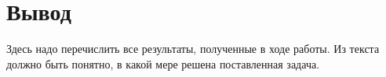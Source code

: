 \section{Вывод}
\label{sec:Chapter6} 

Здесь надо перечислить все результаты, полученные в ходе работы. Из текста
должно быть понятно, в какой мере решена поставленная задача.

\newpage
